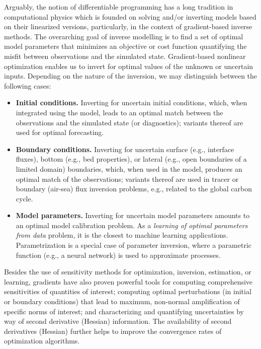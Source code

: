 Arguably, the notion of differentiable programming has a long tradition in computational physics which is founded on solving and/or inverting models based on their linearized versions, particularly, in the context of gradient-based inverse methods.
The overarching goal of inverse modelling is to find a set of optimal model parameters that minimizes an objective or cost function quantifying the misfit between observations and the simulated state.
Gradient-based nonlinear optimization enables us to invert for optimal values of the unknown or uncertain inputs.
Depending on the nature of the inversion, we may distinguish between the following cases:
\begin{itemize}
    \item \textbf{Initial conditions.} Inverting for uncertain initial conditions, which, when integrated using the model, leads to an optimal match between the observations and the simulated state (or diagnostics); variants thereof are used for optimal forecasting.
    \item \textbf{Boundary conditions.} Inverting for uncertain surface (e.g., interface fluxes), bottom (e.g., bed properties), or lateral (e.g., open boundaries of a limited domain) boundaries, which, when used in the model, produces an optimal match of the observations; variants thereof are used in tracer or boundary (air-sea) flux inversion problems, e.g., related to the global carbon cycle.
    \item \textbf{Model parameters.} Inverting for uncertain model parameters amounts to an optimal model calibration problem. As a \textit{learning of optimal parameters from data} problem, it is the closest to machine learning applications. Parametrization is a special case of parameter inversion, where a parametric function (e.g., a neural network) is used to approximate processes. 
\end{itemize}
Besides the use of sensitivity methods for optimization, inversion, estimation, or learning, gradients have also proven powerful tools for computing comprehensive sensitivities of quantities of interest; computing optimal perturbations (in initial or boundary conditions) that lead to maximum, non-normal amplification of specific norms of interest; and characterizing and quantifying uncertainties by way of second derivative (Hessian) information.
The availability of second derivatives (Hessian) further helps to improve the convergence rates of optimization algorithms.

